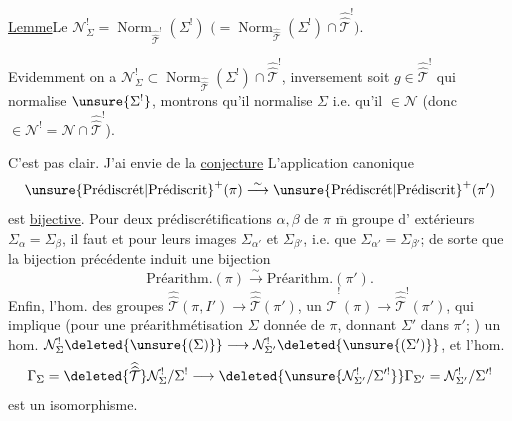\uline{Lemme}\quad Le
$\mathcal N^{!}_{\Sigma}=\operatorname{Norm}_{\widehat{\widehat{\mathcal T}}^{!}}(\Sigma^{!})$
$\bigl(=\operatorname{Norm}_{\widehat{\widehat{\mathcal T}}}(\Sigma^{!})\cap
\widehat{\widehat{\mathcal T}}^{!}\bigr)$.


Evidemment on a
$\mathcal N^{!}_{\Sigma}\subset
\operatorname{Norm}_{\widehat{\widehat{\mathcal T}}}(\Sigma^{!})\cap
\widehat{\widehat{\mathcal T}}^{!}$,
inversement soit $g\in\widehat{\widehat{\mathcal T}}^{!}$ qui normalise
$\unsure{\Sigma^{!}}$, montrons qu'il normalise $\Sigma$ i.e.
qu'il  $\in\mathcal N$
(donc $\in\mathcal N^{!}=\mathcal N\cap\widehat{\widehat{\mathcal T}}^{!}$).


C'est pas clair. J'ai  envie de   la
\uline{conjecture} L'application canonique
\[
\unsure{\text{Prédiscrét}|\text{Prédiscrit}}^{+}(\pi)
 \overset{\sim}{\longrightarrow}
\unsure{\text{Prédiscrét}|\text{Prédiscrit}}^{+}(\pi')
\]
est \uline{bijective}. Pour  deux prédiscrétifications 
$\alpha,\beta$ de $\pi$   $\overline{\mathrm m}$ groupe d' extérieurs
$\Sigma_\alpha=\Sigma_\beta$,  il faut et 
 
pour leurs images $\Sigma_{\alpha'}$ et $\Sigma_{\beta'}$, i.e. que
$\Sigma_{\alpha'}=\Sigma_{\beta'}$; de sorte que la bijection précédente induit une bijection
\[
\text{Préarithm.}(\pi)\overset{\sim}{\longrightarrow}\text{Préarithm.}(\pi').
\]
Enfin, 
l'hom. des groupes 
$\widehat{\widehat{\mathcal T}}(\pi,I')\longrightarrow\widehat{\widehat{\mathcal T}}(\pi')$,
 
un $\widehat{\widehat{\mathcal T}}^{!}(\pi)\longrightarrow\widehat{\widehat{\mathcal T}}^{!}(\pi')$,
 qui implique 
(pour une préarithmétisation $\Sigma$ 
donnée de $\pi$, donnant $\Sigma'$ 
dans $\pi'$; ) un
hom.
$\mathcal N_\Sigma^{!}\deleted{\unsure{(\Sigma)}}\longrightarrow
\mathcal N_{\Sigma'}^{!}\deleted{\unsure{(\Sigma')}}$,
 et l'hom. 
\[
\Gamma_\Sigma=\deleted{\widehat{\widehat{\mathcal T}}}\mathcal N_\Sigma^{!}/\Sigma^{!}
 \longrightarrow
\deleted{\unsure{\mathcal N_{\Sigma'}^{!}/\Sigma'^{!}}}\Gamma_{\Sigma'}=\mathcal N_{\Sigma'}^{!}/\Sigma'^{!}
\]
est un isomorphisme.

